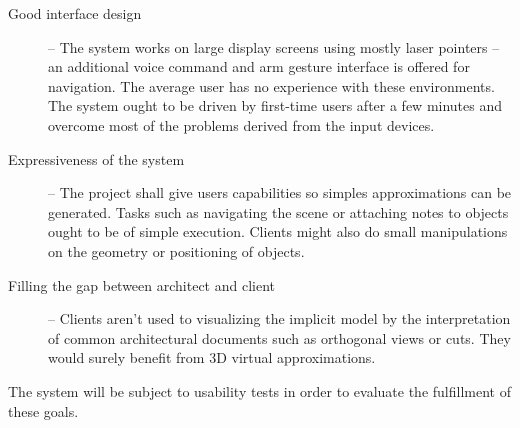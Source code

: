 
\begin{description}
	\item[Good interface design] --
		The system works on large display screens using mostly laser pointers
		-- an additional voice command and arm gesture interface is offered for navigation.
		The average user has no experience with these environments.
		The system ought to be driven by first-time users after a few minutes and overcome most of the
		problems derived from the input devices.
		
	\item[Expressiveness of the system] --
		The project shall give users capabilities so simples approximations can be generated.
		Tasks such as navigating the scene or attaching notes to objects ought to be of simple execution.
		Clients might also do small manipulations on the geometry or positioning of objects.
	
	\item[Filling the gap between architect and client] --
		Clients aren't used to visualizing the implicit model by the interpretation of 
		common architectural documents such as orthogonal views or cuts.
		They would surely benefit from 3D virtual approximations.
\end{description}

The system will be subject to usability tests in order to evaluate the fulfillment of these goals.

